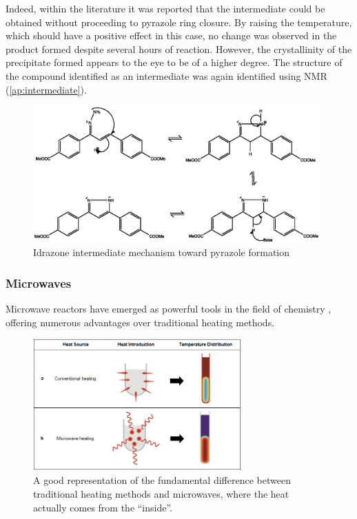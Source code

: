 \documentclass[../Master.tex]{subfiles}
\begin{document}
Indeed, within the literature it was reported that the intermediate could be obtained without proceeding to pyrazole ring closure. By raising the temperature, which should have a positive effect in this case, no change was observed in the product formed despite several hours of reaction. However, the crystallinity of the precipitate formed appears to the eye to be of a higher degree. The structure of the compound identified as an intermediate was again identified using NMR (\ref{ap:intermediate}).

\begin{figure}[h!]
	\centering
	\includegraphics[width=11cm,keepaspectratio]{Structures/idrazonemecha.eps}
	\caption{Idrazone intermediate mechanism toward pyrazole formation}
\end{figure}

\subsubsection{Microwaves}\label{sec:micro}

Microwave reactors have emerged as powerful tools in the field of chemistry \cite{priecel_advantages_2019}, offering numerous advantages over traditional heating methods.

\begin{figure}[h!]
	\centering
	\includegraphics[width=8cm,keepaspectratio]{Images/05_microwave-heat-introduction.jpg}
	\caption{A good representation of the fundamental difference between traditional heating methods and microwaves, where the heat actually comes from the ``inside''.}
\end{figure}
\end{document}
